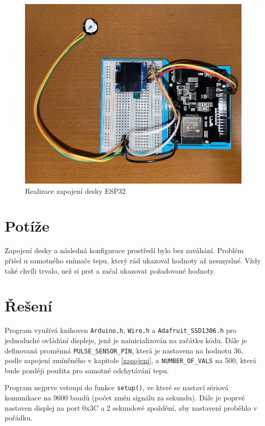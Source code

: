 \documentclass[11.5pt]{article}
\begin{document}
        \begin{figure}[H]
          \centering
          \includegraphics[width=\linewidth]{pic/zapojeni.png}
          \caption{Realizace zapojení desky ESP32}
          \label{fig:esp32}
        \end{figure}

    \section{Potíže}
        Zapojení desky a následná konfigurace prostředí bylo bez zaváhání. Problém přišel u samotného snímače tepu, který rád ukazoval hodnoty až nesmyslné. Vždy také chvíli trvalo, než si 
        prst  a začal ukazovat požadované hodnoty.

    \section{Řešení}
        Program využívá knihoven \texttt{Arduino.h}, \texttt{Wire.h} a \texttt{Adafruit\_SSD1306.h} pro jednoduché ovládání displeje, jenž je nainicializován na začátku kódu. Dále je definovaná proměnná \texttt{PULSE\_SENSOR\_PIN}, která je nastavena na hodnotu 36, podle zapojení zmíněného v kapitole \ref{zapojeni}, a \texttt{NUMBER\_OF\_VALS} na 500, která bude později použita pro samotné odchytávání tepu.

        Program nejprve vstoupí do funkce \texttt{setup()}, ve které se nastaví sériová komunikace na 9600 baudů (počet změn signálu za sekundu). Dále je poprvé nastaven displej na port 0x3C a 2 sekundové zpoždění, aby nastavení proběhlo v pořádku.
\end{document}

